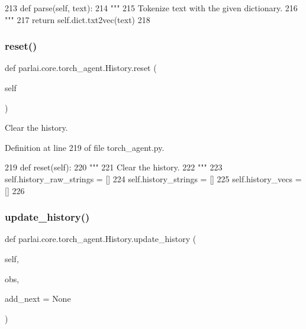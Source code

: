 \begin{DoxyCode}
213     \textcolor{keyword}{def }parse(self, text):
214         \textcolor{stringliteral}{"""}
215 \textcolor{stringliteral}{        Tokenize text with the given dictionary.}
216 \textcolor{stringliteral}{        """}
217         \textcolor{keywordflow}{return} self.dict.txt2vec(text)
218 
\end{DoxyCode}
\mbox{\label{classparlai_1_1core_1_1torch__agent_1_1History_a82e02d0b34707b2e00b95bc659411bae}} 
\subsubsection{\texorpdfstring{reset()}{reset()}}
{\footnotesize\ttfamily def parlai.\+core.\+torch\+\_\+agent.\+History.\+reset (\begin{DoxyParamCaption}\item[{}]{self }\end{DoxyParamCaption})}

\begin{DoxyVerb}Clear the history.
\end{DoxyVerb}
 

Definition at line 219 of file torch\+\_\+agent.\+py.


\begin{DoxyCode}
219     \textcolor{keyword}{def }reset(self):
220         \textcolor{stringliteral}{"""}
221 \textcolor{stringliteral}{        Clear the history.}
222 \textcolor{stringliteral}{        """}
223         self.history\_raw\_strings = []
224         self.history\_strings = []
225         self.history\_vecs = []
226 
\end{DoxyCode}
\mbox{\label{classparlai_1_1core_1_1torch__agent_1_1History_ac7bdfbe78c9f6aed1118161bd24a7c8e}} 
\subsubsection{\texorpdfstring{update\+\_\+history()}{update\_history()}}
{\footnotesize\ttfamily def parlai.\+core.\+torch\+\_\+agent.\+History.\+update\+\_\+history (\begin{DoxyParamCaption}\item[{}]{self,  }\item[{}]{obs,  }\item[{}]{add\+\_\+next = {\ttfamily None} }\end{DoxyParamCaption})}

